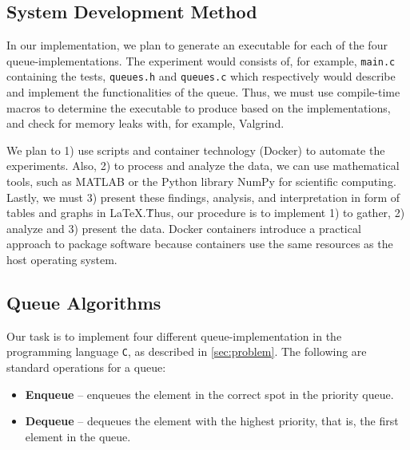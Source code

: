 \documentclass[a4paper,11pt]{kth-mag}
\newcommand*{\skippara}{\par\vspace{\baselineskip} \noindent}
\begin{document}
\subsection{System Development Method}
In our implementation, we plan to generate an executable for each of the four queue-implementations.
The experiment would consists of, for example, \texttt{main.c} containing the tests, \texttt{queues.h} and \texttt{queues.c} which respectively would describe and implement the functionalities of the queue.
Thus, we must use compile-time macros to determine the executable to produce based on the implementations, and check for memory leaks with, for example, Valgrind.

\skippara We plan to 1) use scripts and container technology (Docker) to automate the experiments.
Also, 2) to process and analyze the data, we can use mathematical tools, such as MATLAB or the Python library NumPy for scientific computing.
Lastly, we must 3) present these findings, analysis, and interpretation in form of tables and graphs in \LaTeX.\.
Thus, our procedure is to implement 1) to gather, 2) analyze and 3) present the data.
Docker containers introduce a practical approach to package software because containers use the same resources as the host operating system.

\subsection{Queue Algorithms}\label{sec:algorithms}
\skippara Our task is to implement four different queue-implementation in the programming language \texttt{C}, as described in \cref{sec:problem}.
The following are standard operations for a queue:
\begin{itemize}
    \item \textbf{Enqueue} -- enqueues the element in the correct spot in the priority queue.
    \item \textbf{Dequeue} -- dequeues the element with the highest priority, that is, the first element in the queue.
\end{itemize}
\end{document}

